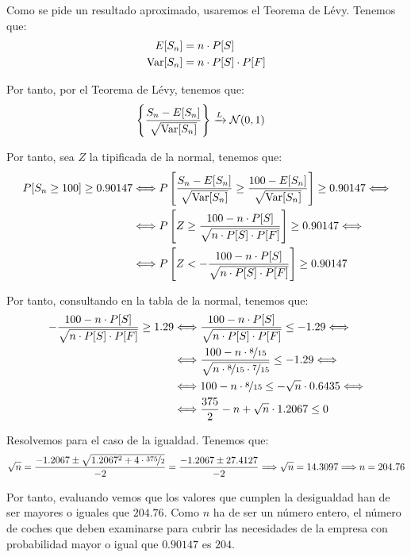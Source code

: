 \begin{ejercicio}
\begin{enumerate}
        Como se pide un resultado aproximado, usaremos el Teorema de Lévy. Tenemos que:
        \begin{align*}
            E[S_{n}] &= n \cdot P[S]\\
            \operatorname{Var}[S_{n}] &= n \cdot P[S] \cdot P[F]
        \end{align*}

        Por tanto, por el Teorema de Lévy, tenemos que:
        \begin{align*}
            \left\{\frac{S_{n}-E[S_n]}{\sqrt{\operatorname{Var}[S_{n}]}}\right\} &\xrightarrow{L} \mathcal{N}(0,1)
        \end{align*}

        Por tanto, sea $Z$ la tipificada de la normal, tenemos que:
        \begin{align*}
            P[S_{n} \geq 100] \geq 0.90147
            &\Longleftrightarrow P\left[\frac{S_{n}-E[S_n]}{\sqrt{\operatorname{Var}[S_{n}]}} \geq \frac{100 - E[S_n]}{\sqrt{\operatorname{Var}[S_{n}]}}\right] \geq 0.90147
            \Longleftrightarrow \\ & \Longleftrightarrow P\left[Z \geq \frac{100 - n \cdot P[S]}{\sqrt{n \cdot P[S] \cdot P[F]}}\right] \geq 0.90147
            \Longleftrightarrow \\ & \Longleftrightarrow P\left[Z < -\frac{100-n \cdot P[S]}{\sqrt{n \cdot P[S] \cdot P[F]}}\right] \geq 0.90147
        \end{align*}

        Por tanto, consultando en la tabla de la normal, tenemos que:
        \begin{align*}
            -\frac{100-n \cdot P[S]}{\sqrt{n \cdot P[S] \cdot P[F]}} \geq 1.29
            &\Longleftrightarrow \frac{100-n \cdot P[S]}{\sqrt{n \cdot P[S] \cdot P[F]}} \leq -1.29
            \Longleftrightarrow \\&\Longleftrightarrow \frac{100-n \cdot \nicefrac{8}{15}}{\sqrt{n \cdot \nicefrac{8}{15} \cdot \nicefrac{7}{15}}} \leq -1.29
            \Longleftrightarrow \\&\Longleftrightarrow 100-n \cdot \nicefrac{8}{15} \leq -\sqrt{n}\cdot 0.6435
            \Longleftrightarrow \\&\Longleftrightarrow \frac{375}{2}-n+\sqrt{n}\cdot 1.2067 \leq 0
        \end{align*}

        Resolvemos para el caso de la igualdad. Tenemos que:
        \begin{equation*}
            \sqrt{n} = \frac{-1.2067\pm \sqrt{1.2067^2+4\cdot \nicefrac{375}{2}}}{-2}
            = \frac{-1.2067\pm 27.4127}{-2}
            \Longrightarrow
            \sqrt{n}=14.3097 \Longrightarrow n=204.76
        \end{equation*}

        Por tanto, evaluando vemos que los valores que cumplen la desigualdad han de ser mayores o iguales que $204.76$. Como $n$ ha de ser un número entero, el número de coches que deben examinarse para cubrir las necesidades de la empresa con probabilidad mayor o igual que $0.90147$ es $204$.
    \end{enumerate}
\end{ejercicio}

